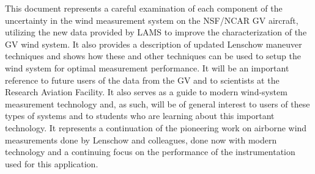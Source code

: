 \documentclass[12pt,twoside,english]{article}\usepackage[]{graphicx}\usepackage[]{color}
\begin{document}
This document represents a careful examination of each component of the
uncertainty in the wind measurement system on the NSF/NCAR GV aircraft,
utilizing the new data provided by LAMS to improve the characterization
of the GV wind system. It also provides a description of updated
Lenschow maneuver techniques and shows how these and other techniques
can be used to setup the wind system for optimal measurement
performance. It will be an important reference to future users of
the data from the GV and to scientists at the Research Aviation
Facility. It also serves as a guide to modern wind-system
measurement technology and, as such, will be of general interest to
users of these types of systems and to students who are learning about
this important technology. It represents a continuation of the
pioneering work on airborne wind measurements done by Lenschow and
colleagues, done now with modern technology and a continuing focus on
the performance of the instrumentation used for this application. 
\cleardoublepage
\renewcommand{\abstractname}{Preface and Abstract}
\end{document}
